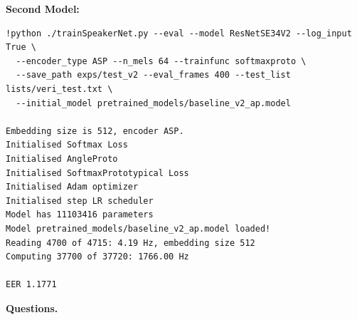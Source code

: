 \documentclass[a4paper]{article}
\begin{document}
\textbf{Second Model:}\\
\begin{verbatim}
!python ./trainSpeakerNet.py --eval --model ResNetSE34V2 --log_input True \
  --encoder_type ASP --n_mels 64 --trainfunc softmaxproto \
  --save_path exps/test_v2 --eval_frames 400 --test_list lists/veri_test.txt \
  --initial_model pretrained_models/baseline_v2_ap.model

Embedding size is 512, encoder ASP.
Initialised Softmax Loss
Initialised AngleProto
Initialised SoftmaxPrototypical Loss
Initialised Adam optimizer
Initialised step LR scheduler
Model has 11103416 parameters
Model pretrained_models/baseline_v2_ap.model loaded!
Reading 4700 of 4715: 4.19 Hz, embedding size 512
Computing 37700 of 37720: 1766.00 Hz

EER 1.1771
\end{verbatim}

\textbf{Questions.}\\
\end{document}
